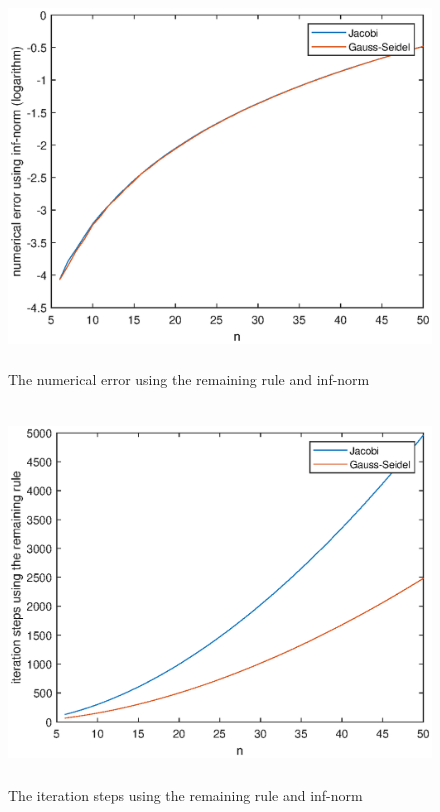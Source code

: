\documentclass[UTF8,a4paper,10pt]{ctexart}
\begin{document}
\begin{figure}[ht]
    \centering
    \includegraphics[width=14cm,height=10cm]{2.1_error_remaining_inf.eps}
    \caption{The numerical error using the remaining rule and inf-norm}
\end{figure}
\begin{figure}[ht]
    \centering
    \includegraphics[width=14cm,height=10cm]{2.1_steps_remaining_inf.eps}
    \caption{The iteration steps using the remaining rule and inf-norm}
\end{figure}
\end{document}
